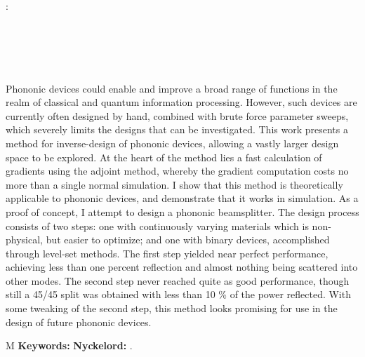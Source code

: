 \thesisImprintTitle:\\
\thesisImprintSubtitle\\[1ex]
\thesisAuthor\\
\thesisDepartment\\
\thesisUniversity

\thispagestyle{plain}           %
\section*{\abstractname}
Phononic devices could enable and improve a broad range of functions in
the realm of classical and quantum information processing.
However, such devices are currently often designed by hand, combined with brute force
parameter sweeps, which severely limits the designs that can be investigated.
This work presents a method for inverse-design of phononic devices,
allowing a vastly larger design space to be explored.
At the heart of the method lies a fast calculation of gradients using the
adjoint method, whereby the gradient computation costs no more than a single
normal simulation.
I show that this method is theoretically applicable to phononic devices,
and demonstrate that it works in simulation.
As a proof of concept, I attempt to design a phononic beamsplitter.
The design process consists of two steps:
one with continuously varying materials which is non-physical,
but easier to optimize;
and one with binary devices, accomplished through level-set methods.
The first step yielded near perfect performance, achieving less than one percent
reflection and almost nothing being scattered into other modes.
The second step never reached quite as good performance, though still a 45/45
split was obtained with less than 10 \% of the power reflected.
With some tweaking of the second step,
this method looks promising for use in the design of future phononic devices.

\if\thesisType M
    \textbf{Keywords:}
\else
    \textbf{Nyckelord:}
\fi
\thesisKeywords.

\if{}
\newpage                %
\thispagestyle{empty}
\mbox{}
\fi
